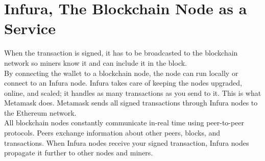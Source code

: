 
\section{Infura, The Blockchain Node as a Service}

When the transaction is signed, it has to be broadcasted to the blockchain network so miners know it and can include it in the block. \\[-8pt]

By connecting the wallet to a blockchain node, the node can run locally or connect to an Infura node. Infura takes care of keeping the nodes upgraded, online, and scaled; it handles as many transactions as you send to it. This is what Metamask does. Metamask sends all signed transactions through Infura nodes to the Ethereum network. \\[-8pt]

All blockchain nodes constantly communicate in-real time using peer-to-peer protocols. Peers exchange information about other peers, blocks, and transactions. When Infura nodes receive your signed transaction, Infura nodes propagate it further to other nodes and miners. \\[-8pt]


